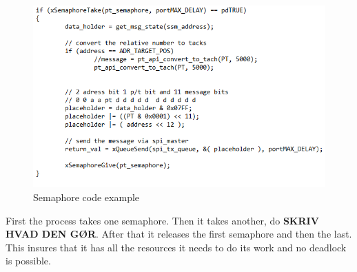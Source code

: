\begin{figure}[h!]
\centering
\includegraphics[scale=0.6]{Billeder/Micro_Controller/Semaphore_code_example.png}
\caption{ Semaphore code example }
\label{fig:Semaphore}
\end{figure}

First the process takes one semaphore. Then it takes another, do \textbf{SKRIV HVAD DEN GØR}. After that it releases the first semaphore and then the last. This insures that it has all the resources it needs to do its work and no deadlock is possible.











